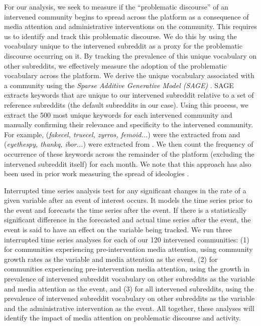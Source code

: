  For our analysis, we seek to measure if the ``problematic
discourse'' of an intervened community begins to spread across the platform as 
a consequence of media attention and administrative interventions on the
community. This requires us to identify and track this problematic discourse.
We do this by using the vocabulary unique to the intervened subreddit as
a proxy for the problematic discourse occurring on it. By tracking the
prevalence of this unique vocabulary on other subreddits, we effectively
measure the adoption of the problematic vocabulary across the platform. We
derive the unique vocabulary associated with a community using the
\emph{Sparse Additive Generative Model (SAGE)} \cite{SAGE}. SAGE extracts
keywords that are unique to our intervened subreddit relative to a set
of reference subreddits (the default subreddits in our case). Using this
process, we extract the 500 most unique keywords for each intervened community
and manually confirming their relevance and specificity to the intervened
community. For example, (\textit{fakecel, truecel, zyrros, femoid...}) were the
extracted from  and
(\textit{eyethespy, thankq, ibor...}) were extracted from
. 
We then count the frequency of occurrence of these keywords across
the remainder of the platform (\ie excluding the intervened subreddit itself)
for each month. 
We note that this approach has also been used in prior work measuring 
the spread of ideologies \cite{eshwar2017you}. 

 Interrupted time series
analysis test for any significant changes in the rate of a given variable after
an event of interest occurs. It models the time series prior to the event and
forecasts the time series after the event. If there is a statistically
significant difference in the forecasted and actual time series after the
event, the event is said to have an effect on the variable being tracked. We
run three interrupted time series analyses for each of our 120 intervened
communities: (1) for communities experiencing pre-intervention media attention,
using community growth rates as the variable and media attention as the event,
(2) for communities experiencing pre-intervention media attention, using the
growth in prevalence of intervened subreddit vocabulary on other subreddits as
the variable and media attention as the event, and (3) for all intervened
subreddits, using the prevalence of intervened subreddit vocabulary on other
subreddits as the variable and the administrative intervention as the event.
All together, these analyses will identify the impact of media attention on
problematic discourse and activity.

